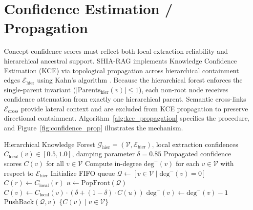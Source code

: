 \documentclass[12pt,a4paper]{report}
\begin{document}
\section{Confidence Estimation / Propagation}
Concept confidence scores must reflect both local extraction reliability and hierarchical ancestral support. SHIA-RAG implements Knowledge Confidence Estimation (KCE) via topological propagation across hierarchical containment edges $\mathcal{E}_{\text{hier}}$ using Kahn's algorithm \cite{kahn1962topological}. Because the hierarchical forest enforces the single-parent invariant ($|\text{Parents}_{\text{hier}}(v)| \le 1$), each non-root node receives confidence attenuation from exactly one hierarchical parent. Semantic cross-links $\mathcal{E}_{\text{cross}}$ provide lateral context and are excluded from KCE propagation to preserve directional containment. Algorithm~\ref{alg:kce_propagation} specifies the procedure, and Figure~\ref{fig:confidence_prop} illustrates the mechanism.

\begin{algorithm}[h!]
\caption{Topological Knowledge Confidence Propagation (KCE)}
\label{alg:kce_propagation}
\begin{algorithmic}[1]
\REQUIRE Hierarchical Knowledge Forest $\mathcal{G}_{\text{hier}} = (\mathcal{V}, \mathcal{E}_{\text{hier}})$, local extraction confidences $C_{\text{local}}(v) \in [0.5, 1.0]$, damping parameter $\delta = 0.85$
\ENSURE Propagated confidence scores $C(v)$ for all $v \in \mathcal{V}$
\STATE Compute in-degree $\text{deg}^-(v)$ for each $v \in \mathcal{V}$ with respect to $\mathcal{E}_{\text{hier}}$
\STATE Initialize FIFO queue $\mathcal{Q} \leftarrow [v \in \mathcal{V} \mid \text{deg}^-(v) = 0]$ 
    \STATE $C(r) \leftarrow C_{\text{local}}(r)$ 
\ENDFOR
{}
    \STATE $u \leftarrow \text{PopFront}(\mathcal{Q})$
        \STATE $C(v) \leftarrow C_{\text{local}}(v) \cdot (\delta + (1 - \delta) \cdot C(u))$
        \STATE $\text{deg}^-(v) \leftarrow \text{deg}^-(v) - 1$
            \STATE $\text{PushBack}(\mathcal{Q}, v)$
        \ENDIF
    \ENDFOR
\ENDWHILE
\RETURN $\{C(v) \mid v \in \mathcal{V}\}$
\end{algorithmic}
\end{algorithm}
\end{document}
